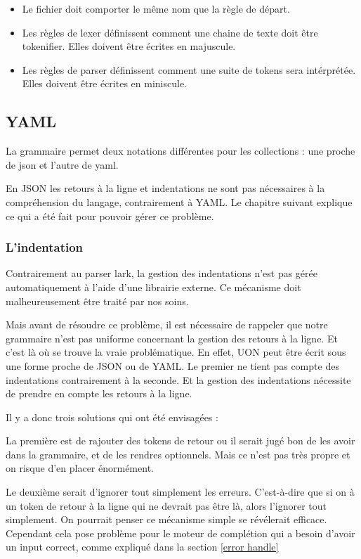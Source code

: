 \documentclass[
    iict, %
    il, %
]{heig-tb}
\begin{document}
\begin{itemize}
    \item Le fichier doit comporter le même nom que la règle de départ.
    \item Les règles de lexer définissent comment une chaine de texte doit être tokenifier. Elles doivent être écrites en majuscule.
    \item Les règles de parser définissent comment une suite de tokens sera intérprétée. Elles doivent être écrites en miniscule.
\end{itemize}

\subsection{YAML}

La grammaire permet deux notations différentes pour les collections : une proche de json et l'autre de yaml.

En JSON les retours à la ligne et indentations ne sont pas nécessaires à la compréhension du langage, contrairement à YAML.
Le chapitre suivant explique ce qui a été fait pour pouvoir gérer ce problème.

\subsubsection{L'indentation}

Contrairement au parser lark, la gestion des indentations n'est pas gérée automatiquement à l'aide d'une librairie externe.
Ce mécanisme doit malheureusement être traité par nos soins.

Mais avant de résoudre ce problème, il est nécessaire de rappeler que notre grammaire n'est pas uniforme concernant la gestion des retours à la ligne.
Et c'est là où se trouve la vraie problématique. En effet, UON peut être écrit sous une forme proche de JSON ou de YAML. Le premier ne tient pas compte des indentations contrairement à la seconde.
Et la gestion des indentations nécessite de prendre en compte les retours à la ligne.

Il y a donc trois solutions qui ont été envisagées :

La première est de rajouter des tokens de retour ou il serait jugé bon de les avoir dans la grammaire, et de les rendres optionnels.
Mais ce n'est pas très propre et on risque d'en placer énormément.

Le deuxième serait d'ignorer tout simplement les erreurs.  C'est-à-dire que si on à un token de retour à la ligne qui ne devrait pas être là, alors l'ignorer tout simplement.
On pourrait penser ce mécanisme simple se révélerait efficace. Cependant cela pose problème pour le moteur de complétion qui a besoin d'avoir un input correct, comme expliqué dans la section \ref{error handle}
\end{document}
